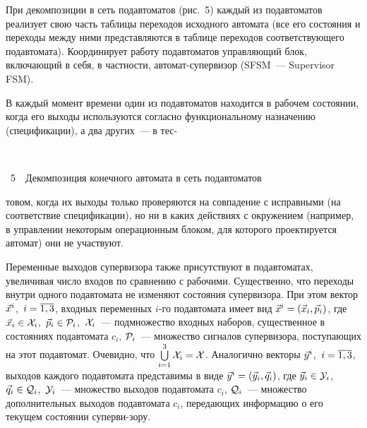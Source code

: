 \begin{multicols}{2}
При декомпозиции в сеть подавтоматов (рис.~5) каждый из подавтоматов
реализует свою
часть таб\-ли\-цы переходов исходного автомата (все его состояния и переходы
между ними представляются в таблице переходов соответствующего подавтомата).
Координирует работу подавтоматов управляющий блок, включающий в себя,
в частности, автомат-супервизор (SFSM~--- Supervisor FSM).



В каждый момент времени один из подавтоматов находится в рабочем состоянии,
когда его  выходы используются согласно функциональному
назначению (спецификации), а два других~--- в тес-\linebreak

\begin{center} %
\vspace*{6pt}
\mbox{%
\epsfxsize=75.494mm
}
\end{center}
{{\figurename~5}\ \ \small{Декомпозиция конечного автомата в сеть подавтоматов}}

\bigskip
\medskip
\addtocounter{figure}{1}


\noindent
то\-вом, когда их выходы только проверяются на совпадение
с исправными (на соответствие спецификации), но ни в каких действиях с
окружением (например, в управлении некоторым операционным блоком, для которого
проектируется автомат) они не участвуют.

Переменные выходов супервизора также присутствуют в подавтоматах, увеличивая
число входов по сравнению с рабочими.
Существенно, что переходы внутри одного подавтомата не изменяют состояния
супервизора.
При этом вектор $\vec x^i$,\ $i=\overline{1,3}$, входных переменных $i$-го подавтомата
имеет вид $\vec x^i=(\vec x_i,\vec p_i)$, где
$\vec x_i \in {\cal X}_i$,\ $\vec p_i \in {\cal P}_i$,\ ${\cal X}_i$~---
подмножество входных наборов, существенное в состояниях подавтомата $c_i$,
${\cal P}_i$~--- множество сигналов супервизора, поступающих на этот подавтомат.
Очевидно, что
$\bigcup\limits_{i=1}^3 {\cal X}_i = {\cal X}$.
Аналогично векторы $\vec y^i$,\ $i=\overline{1,3}$, выходов каждого подавтомата
представимы в виде $\vec y^i=(\vec y_i,\vec q_i)$, где
$\vec y_i \in {\cal Y}_i$,\ $\vec q_i \in {\cal Q}_i$,\ ${\cal Y}_i$~---
множество выходов подавтомата $c_i$, ${\cal Q}_i$~--- множество
дополнительных выходов подавтомата $c_i$, передающих информацию
о его текущем состоянии супер\-ви-\linebreak зору.



\end{multicols}
